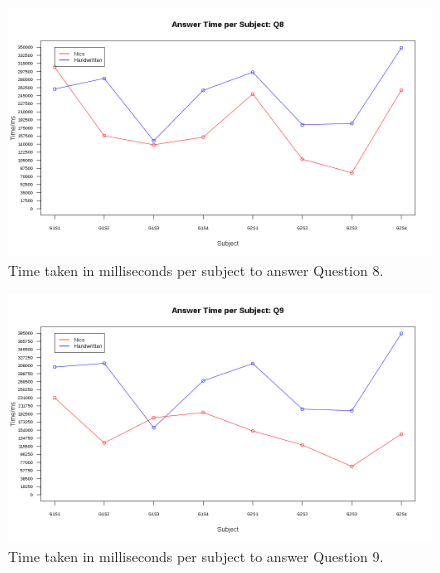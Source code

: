 \documentclass[12pt,twoside,notitlepage,xetex]{report}
\begin{document}
\begin{center}
\begin{figure}[H]
\begin{center}
\includegraphics[width=\textwidth-2cm]{figs/graphs/q8.png}
\end{center}
\caption{Time taken in milliseconds per subject to answer Question 8.}
\end{figure}
\end{center}

\begin{center}
\begin{figure}[H]
\begin{center}
\includegraphics[width=\textwidth-2cm]{figs/graphs/q9.png}
\end{center}
\caption{Time taken in milliseconds per subject to answer Question 9.}
\end{figure}
\end{center}
\end{document}

